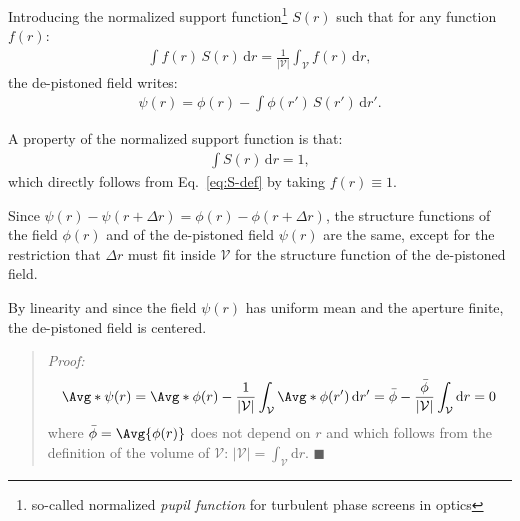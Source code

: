 \documentclass{article}
\begin{document}
Introducing the normalized support function\footnote{so-called normalized \emph{pupil
    function} for turbulent phase screens in optics} $S(r)$ such that for any function
$f(r)$:
\begin{align}
  \label{eq:S-def}
  \int f(r)\,S(r)\,\mathrm{d}r = \frac{1}{|\mathcal{V}|} \int_{\mathcal{V}} f(r)\,\mathrm{d}r,
\end{align}
the de-pistoned field writes:
\begin{align}
  \psi(r) = \phi(r) - \int \phi(r')\,S(r')\,\mathrm{d}r'.
\end{align}

A property of the normalized support function is that:
\begin{align}
  \int S(r)\,\mathrm{d}r = 1,
  \label{eq:int-S=1}
\end{align}
which directly follows from Eq.~\eqref{eq:S-def} by taking $f(r) \equiv 1$.

Since $\psi(r) - \psi(r + \Delta r) = \phi(r) - \phi(r + \Delta r)$, the structure
functions of the field $\phi(r)$ and of the de-pistoned field $\psi(r)$ are the same,
except for the restriction that $\Delta r$ must fit inside $\mathcal{V}$ for the structure
function of the de-pistoned field.

By linearity and since the field $\psi(r)$ has uniform mean and the aperture finite, the
de-pistoned field is centered.
\begin{quote}
  \emph{Proof:}
  \begin{align}
    \Avg*{\psi(r)}
    = \Avg*{\phi(r)} -
      \frac{1}{|\mathcal{V}|} \int_{\mathcal{V}} \Avg*{\phi(r')}\,\mathrm{d}r'
    = \bar{\phi} - \frac{\bar{\phi}}{|\mathcal{V}|} \int_{\mathcal{V}}\mathrm{d}r = 0
  \end{align}
  where $\bar{\phi} = \Avg{\phi(r)}$ does not depend on $r$ and which follows from the
  definition of the volume of $\mathcal{V}$:
  $|\mathcal{V}|=\int_{\mathcal{V}}\mathrm{d}r$. $\blacksquare$
\end{quote}
\end{document}
